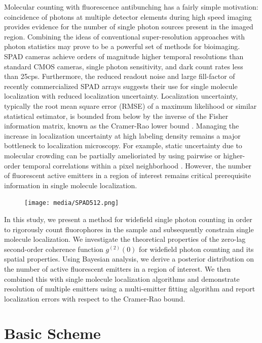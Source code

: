 Molecular counting with fluorescence antibunching has a fairly simple motivation: coincidence of photons at multiple detector elements during high speed imaging provides evidence for the number of single photon sources present in the imaged region. Combining the ideas of conventional super-resolution approaches with photon statistics may prove to be a powerful set of methods for bioimaging. SPAD cameras achieve orders of magnitude higher temporal resolutions than standard CMOS cameras, single photon sensitivity, and dark count rates less than 25cps. Furthermore, the reduced readout noise and large fill-factor of recently commercialized SPAD arrays suggests their use for single molecule localization with reduced localization uncertainty. Localization uncertainty, typically the root mean square error (RMSE) of a maximum likelihood or similar statistical estimator, is bounded from below by the inverse of the Fisher information matrix, known as the Cramer-Rao lower bound \parencite{Chao2016}. Managing the increase in localization uncertainty at high labeling density remains a major bottleneck to localization microscopy. For example, static uncertainty due to molecular crowding can be partially amelioriated by using pairwise or higher-order temporal correlations within a pixel neighborhood \parencite{Dertinger2009}. However, the number of fluorescent active emitters in a region of interest remains critical prerequisite information in single molecule localization.

\begin{figure}[t]
\centering
\texttt{[image: media/SPAD512.png]}
\caption{}
\end{figure}    


In this study, we present a method for widefield single photon counting in order to rigorously count fluorophores in the sample and subsequently constrain single molecule localization. We investigate the theoretical properties of the zero-lag second-order coherence function $g^{(2)}(0)$ for widefield photon counting and its spatial properties. Using Bayesian analysis, we derive a posterior distribution on the number of active fluorescent emitters in a region of interest. We then combined this with single molecule localization algorithms and demonstrate resolution of multiple emitters using a multi-emitter fitting algorithm and report localization errors with respect to the Cramer-Rao bound.

\section{Basic Scheme}

